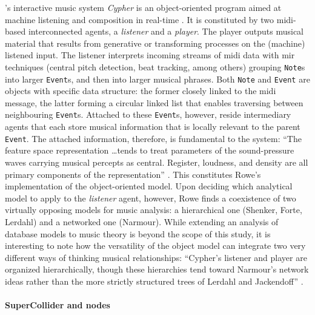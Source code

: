 	\citeauthor{Row92:Int}'s interactive music system \textit{Cypher} is an object-oriented program aimed at machine listening and composition in real-time \parencite{Row92:Int}. It is constituted by two \gls{midi}-based interconnected agents, a \textit{listener} and a \textit{player}. The player outputs musical material that results from generative or transforming processes on the (machine) listened input. The listener interprets incoming streams of \gls{midi} data with \gls{mir} techniques (central pitch detection, beat tracking, among others) grouping \texttt{Note}s into larger \texttt{Event}s, and then into larger musical phrases. Both \texttt{Note} and \texttt{Event} are objects with specific data structure: the former closely linked to the \gls{midi} message, the latter forming a circular linked list that enables traversing between neighbouring \texttt{Event}s. Attached to these \texttt{Event}s, however, reside intermediary agents that each store musical information that is locally relevant to the parent \texttt{Event}. The attached information, therefore, is fundamental to the system: ``The feature space representation \dots tends to treat parameters of the sound-pressure waves carrying musical percepts as central. Register, loudness, and density are all primary components of the representation'' \parencite[Chapter~7]{Row92:Int}. This constitutes Rowe's implementation of the object-oriented model. Upon deciding which analytical model to apply to the \textit{listener} agent, however, Rowe finds a coexistence of two virtually opposing models for music analysis: a hierarchical one (Shenker, Forte, Lerdahl) and a networked one (Narmour). While extending an analysis of database models to music theory is beyond the scope of this study, it is interesting to note how the versatility of the object model can integrate two very different ways of thinking musical relationships: ``Cypher's listener and player are organized hierarchically, though these hierarchies tend toward Narmour's network ideas rather than the more strictly structured trees of Lerdahl and Jackendoff'' \parencite[Chapter~4.3]{Row92:Int}. 

	\paragraph{SuperCollider and nodes}
	\label{computer:supercollider}

